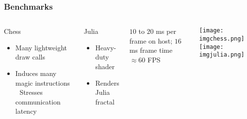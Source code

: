 \begin{frame}
\frametitle{Benchmarks}

\begin{columns}

  \begin{block}{Chess}
    \begin{itemize}
    \item Many lightweight draw calls
    \item Induces many magic instructions  Stresses communication latency
    \end{itemize}
  \end{block}

  \begin{block}{Julia}
    \begin{itemize}
    \item Heavy-duty shader
    \item Renders Julia fractal
    \end{itemize}
  \end{block}

  $10$ to $20$ ms per frame on host; $16$ ms frame time $\approx60$ FPS
  

  \texttt{[image: imgchess.png]}
  \texttt{[image: imgjulia.png]}

\end{columns}
	
\end{frame}
